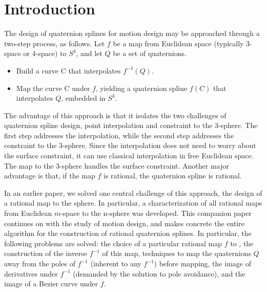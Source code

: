 \documentclass[11pt]{article}
\begin{document}
{%
% 
}


\section{Introduction}

The design of quaternion splines for motion design may be approached through
a two-step process, as follows.
Let $f$ be a map from Euclidean space (typically 3-space or 4-space) to $S^3$,
and let $Q$ be a set of quaternions.

\begin{itemize}
\item Build a curve C that interpolates $f^{-1}(Q)$.
\item Map the curve C under $f$, yielding a quaternion spline $f(C)$ 
      that interpolates $Q$, embedded in $S^3$.
\end{itemize}

The advantage of this approach is that it isolates the two challenges
of quaternion spline design, point interpolation and constraint to the 3-sphere.
The first step addresses the interpolation, while the second step addresses the constraint
to the 3-sphere.
Since the interpolation does not need to worry about the surface constraint, it can use
classical interpolation in free Euclidean space.
The map to the 3-sphere handles the surface constraint.
Another major advantage is that, if the map $f$ is rational, 
the quaternion spline is rational.

In an earlier paper, we solved one central challenge of this approach, 
the design of a rational map to the sphere.
In particular, a characterization of all rational maps from Euclidean $m$-space 
to the n-sphere was developed.
This companion paper continues on with the study of motion design,
and makes concrete the entire algorithm for the construction of rational 
quaternion splines.
In particular, the following problems are solved:
the choice of a particular rational map $f$ to ,
the construction of the inverse $f^{-1}$ of this map,
techniques to map the quaternions $Q$ away from the poles of $f^{-1}$ (inherent to any
$f^{-1}$) before mapping,
the image of derivatives under $f^{-1}$ (demanded by the solution to pole avoidance),
and the image of a Bezier curve under $f$.
\end{document}
